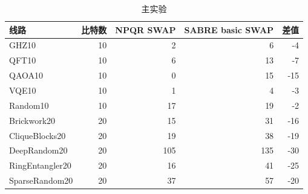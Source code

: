 \begin{table}[H]
  \centering
  \caption{主实验}
  \label{tab:final-basic-matrix}
  \begin{tabular}{lrrrr}
    \toprule
    线路 & 比特数 & NPQR SWAP & SABRE basic SWAP & 差值 \\
    \midrule
    GHZ10 & 10 & 2 & 6 & -4 \\
    QFT10 & 10 & 6 & 13 & -7 \\
    QAOA10 & 10 & 0 & 15 & -15 \\
    VQE10 & 10 & 1 & 4 & -3 \\
    Random10 & 10 & 17 & 19 & -2 \\
    Brickwork20 & 20 & 15 & 31 & -16 \\
    CliqueBlocks20 & 20 & 19 & 38 & -19 \\
    DeepRandom20 & 20 & 105 & 135 & -30 \\
    RingEntangler20 & 20 & 16 & 41 & -25 \\
    SparseRandom20 & 20 & 37 & 57 & -20 \\
    \bottomrule
  \end{tabular}
\end{table}
